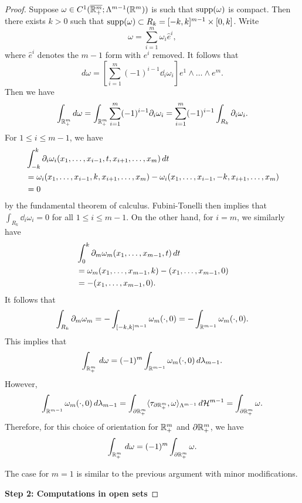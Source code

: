 \documentclass[a4paper]{article}
\begin{document}
\begin{proof}
  Suppose $\omega \in C^1 (\overline{\mathbb{R}^{m}_+} ; \Lambda^{m-1} (\mathbb{R}^m))$ is such
  that $\operatorname{supp}(\omega)$ is compact. Then there exists $k > 0$ such that
  $\operatorname{supp} (\omega) \subset R_k = [-k, k]^{m-1} \times [0, k]$. Write
  \[
    \omega = \sum_{i=1}^m \omega_i \hat{e}^i,
  \]
  where $\hat{e}^i$ denotes the $m-1$ form with $e^i$ removed. It follows
  that
  \[
    d \omega = \left[ \sum_{i=1}^m (-1)^{i-1} \dd_i \omega_i
      \right] e^1 \wedge \dots \wedge e^m.
  \]
  Then we have
  \[
    \int_{\mathbb{R}^m_+} d \omega =
    \int_{\mathbb{R}^m_+} \sum_{i=1}^m (-1)^{i-1} \partial_i \omega_i
    = \sum_{i=1}^m (-1)^{i-1} \int_{R_k} \partial_i \omega_i.
  \]
  For $1 \leq i \leq m - 1$, we have
  \[
    \begin{aligned}
       & \int_{-k}^k \partial_i \omega_i (x_1, \dots, x_{i-1},
      t, x_{i+1}, \dots, x_m) \, d t                                \\
       & = \omega_i (x_1, \dots, x_{i-1}, k, x_{i+1}, \dots, x_m)
      - \omega_i (x_1, \dots, x_{i-1}, -k, x_{i+1}, \dots, x_m)   \\
       & = 0
    \end{aligned}
  \]
  by the fundamental theorem of calculus. Fubini-Tonelli then implies that
  $\int_{R_k} \dd_i \omega_i = 0$ for all $1 \leq i \leq m - 1$. On the
  other hand, for $i = m$, we similarly have
  \[
    \begin{aligned}
       & \int_0^k \partial_m \omega_m (x_1, \dots, x_{m-1}, t) \, d t \\
       & = \omega_m (x_1, \dots, x_{m-1}, k)
      - (x_1, \dots, x_{m-1}, 0)                               \\
       & = - (x_1, \dots, x_{m-1}, 0).
    \end{aligned}
  \]
  It follows that
  \[
    \int_{R_k} \partial_m \omega_m
    = - \int_{[-k, k]^{m-1}} \omega_m (\cdot, 0)
    = - \int_{\mathbb{R}^{m-1}} \omega_m (\cdot, 0).
  \]
  This implies that
  \[
    \int_{\mathbb{R}^m_+} \, d \omega
    = (-1)^m \int_{\mathbb{R}^{m-1}} \omega_m (\cdot, 0) \, d \lambda_{m-1}.
  \]
  However,
  \[
    \int_{\mathbb{R}^{m-1}} \omega_m (\cdot, 0) \, d \lambda_{m-1}
    = \int_{\partial \mathbb{R}^m_+} \langle \tau_{\partial \mathbb{R}^m_+}, \omega
    \rangle_{\Lambda^{m-1}}
    \, d \mathcal{H}^{m-1}
    = \int_{\partial \mathbb{R}^{m}_+} \omega.
  \]
  Therefore, for this choice of orientation for $\mathbb{R}^m_+$ and $\partial \mathbb{R}^m_+$,
  we have
  \[
    \int_{\mathbb{R}^m_+} \, d \omega = (-1)^m \int_{\partial \mathbb{R}^m_+} \omega.
  \]

  The case for $m = 1$ is similar to the previous argument with minor
  modifications.

  \textbf{Step 2: Computations in open sets}


\end{proof}
\end{document}
